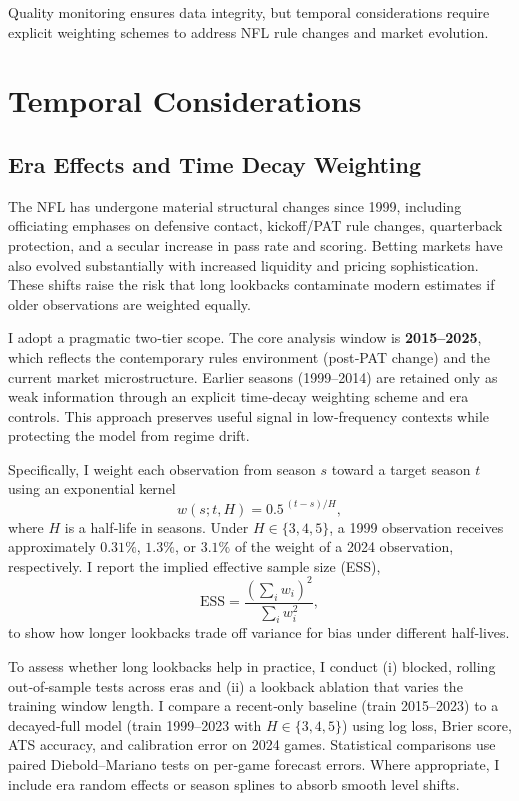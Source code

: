 Quality monitoring ensures data integrity, but temporal considerations require explicit weighting schemes to address NFL rule changes and market evolution.

\section{Temporal Considerations}
\label{sec:temporal}

\subsection{Era Effects and Time Decay Weighting}
\label{subsec:era-effects}
The NFL has undergone material structural changes since 1999, including officiating emphases on defensive contact, kickoff/PAT rule changes, quarterback protection, and a secular increase in pass rate and scoring. Betting markets have also evolved substantially with increased liquidity and pricing sophistication. These shifts raise the risk that long lookbacks contaminate modern estimates if older observations are weighted equally.

I adopt a pragmatic two‑tier scope. The core analysis window is \textbf{2015--2025}, which reflects the contemporary rules environment (post‑PAT change) and the current market microstructure. Earlier seasons (1999--2014) are retained only as weak information through an explicit time‑decay weighting scheme and era controls. This approach preserves useful signal in low‑frequency contexts while protecting the model from regime drift.

Specifically, I weight each observation from season $s$ toward a target season $t$ using an exponential kernel
\begin{equation}
w(s; t, H) = 0.5^{\,(t - s)/H},
\end{equation}
where $H$ is a half‑life in seasons. Under $H\in\{3,4,5\}$, a 1999 observation receives approximately $0.31\%$, $1.3\%$, or $3.1\%$ of the weight of a 2024 observation, respectively. I report the implied effective sample size (ESS),
\begin{equation}
\mathrm{ESS} = \frac{\left(\sum_i w_i\right)^2}{\sum_i w_i^2},
\end{equation}
to show how longer lookbacks trade off variance for bias under different half‑lives.

To assess whether long lookbacks help in practice, I conduct (i) blocked, rolling out‑of‑sample tests across eras and (ii) a lookback ablation that varies the training window length. I compare a recent‑only baseline (train 2015--2023) to a decayed‑full model (train 1999--2023 with $H\in\{3,4,5\}$) using log loss, Brier score, ATS accuracy, and calibration error on 2024 games. Statistical comparisons use paired Diebold--Mariano tests on per‑game forecast errors. Where appropriate, I include era random effects or season splines to absorb smooth level shifts.

